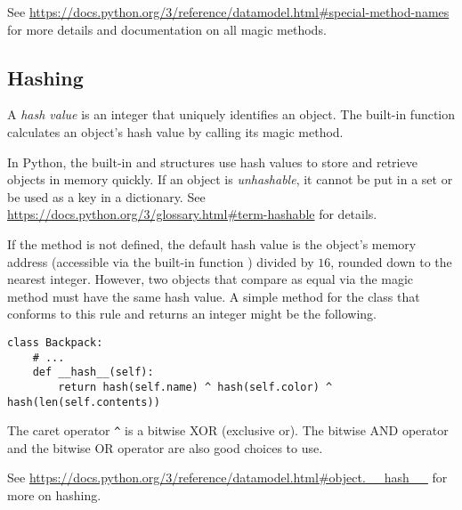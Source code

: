 See \url{https://docs.python.org/3/reference/datamodel.html\#special-method-names} for more details and documentation on all magic methods.

\subsection*{Hashing} %

A \emph{hash value} is an integer that uniquely identifies an object.
The built-in  function calculates an object's hash value by calling its  magic method.
%

In Python, the built-in  and  structures use hash values to store and retrieve objects in memory quickly.
If an object is \emph{unhashable}, it cannot be put in a set or be used as a key in a dictionary.
See \url{https://docs.python.org/3/glossary.html\#term-hashable} for details.

If the  method is not defined, the default hash value is the object's memory address (accessible via the built-in function ) divided by $16$, rounded down to the nearest integer.
However, two objects that compare as equal via the  magic method must have the same hash value.
A simple  method for the  class that conforms to this rule and returns an integer might be the following.

\begin{lstlisting}
class Backpack:
    # ...
    def __hash__(self):
        return hash(self.name) ^ hash(self.color) ^ hash(len(self.contents))
\end{lstlisting}

The caret operator \texttt{\^} is a bitwise XOR (exclusive or).
The bitwise AND operator \li{&} and the bitwise OR operator \li{|} are also good choices to use.

See \url{https://docs.python.org/3/reference/datamodel.html\#object.__hash__} for more on hashing.

